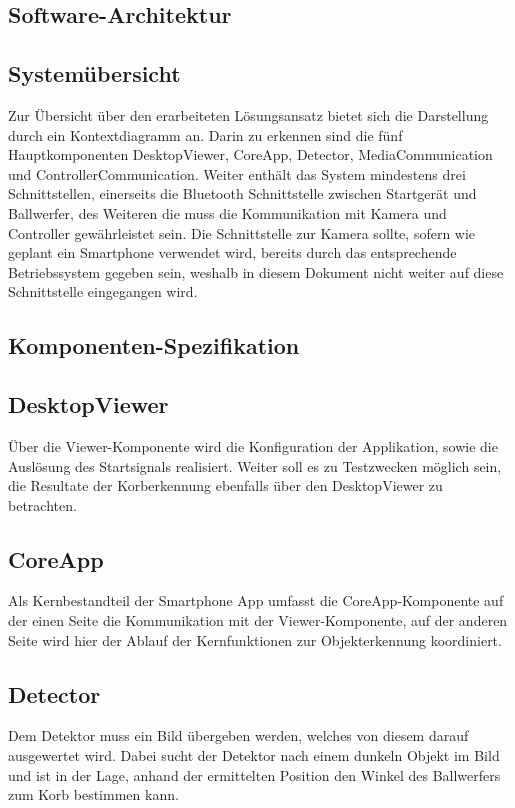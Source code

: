 \subsection{Software-Architektur}
	\subsection{Systemübersicht}
	Zur Übersicht über den erarbeiteten Lösungsansatz bietet sich die Darstellung durch ein Kontextdiagramm an. Darin zu erkennen sind die fünf Hauptkomponenten  DesktopViewer, CoreApp, Detector, MediaCommunication und ControllerCommunication. Weiter enthält das System mindestens drei Schnittstellen, einerseits die Bluetooth Schnittstelle zwischen Startgerät und Ballwerfer, des Weiteren die muss die Kommunikation mit Kamera und Controller gewährleistet sein. Die Schnittstelle zur Kamera sollte, sofern wie geplant ein Smartphone verwendet wird, bereits durch das entsprechende Betriebssystem gegeben sein, weshalb in diesem Dokument nicht weiter auf diese Schnittstelle eingegangen wird.
	
	\subsection{Komponenten-Spezifikation}
		\subsection{DesktopViewer}
		Über die Viewer-Komponente wird die Konfiguration der Applikation, sowie die Auslösung des Startsignals realisiert. Weiter soll es zu Testzwecken möglich sein, die Resultate der Korberkennung ebenfalls über den DesktopViewer zu betrachten.
		
		\subsection{CoreApp}
		Als Kernbestandteil der Smartphone App umfasst die CoreApp-Komponente auf der einen Seite die Kommunikation mit der Viewer-Komponente, auf der anderen Seite wird hier der Ablauf der Kernfunktionen zur Objekterkennung koordiniert.
		
		\subsection{Detector}
		Dem Detektor muss ein Bild übergeben werden, welches von diesem darauf ausgewertet wird. Dabei sucht der Detektor nach einem dunkeln Objekt im Bild und ist in der Lage, anhand der ermittelten Position den Winkel des Ballwerfers zum Korb bestimmen kann.
		
